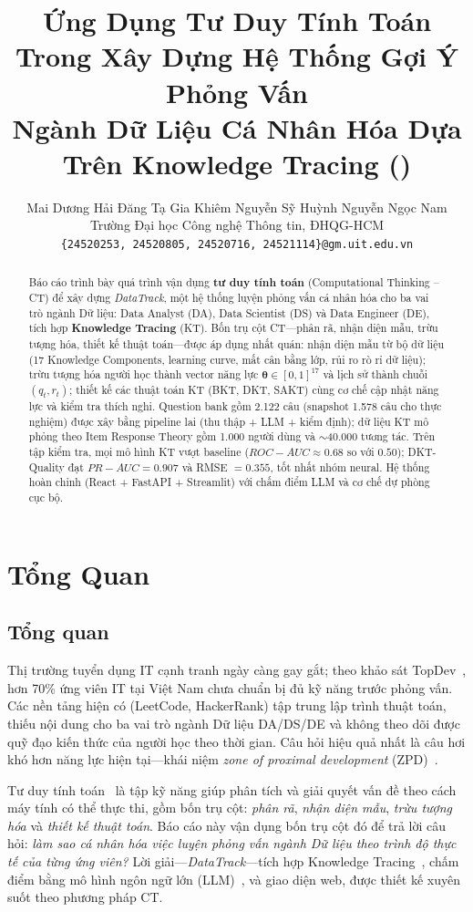 \documentclass[11pt]{article}
\title{Ứng Dụng Tư Duy Tính Toán Trong Xây Dựng Hệ Thống Gợi Ý Phỏng Vấn\\ Ngành Dữ Liệu Cá Nhân Hóa Dựa Trên Knowledge Tracing (\sys{})}
\author{
  Mai Dương Hải Đăng \quad Tạ Gia Khiêm \quad Nguyễn Sỹ Huỳnh \quad Nguyễn Ngọc Nam \\
  Trường Đại học Công nghệ Thông tin, ĐHQG-HCM \\
  \texttt{\{24520253, 24520805, 24520716, 24521114\}@gm.uit.edu.vn}
}
\newcommand{\sys}{\textit{DataTrack}}
\newcommand{\auc}{ROC-AUC}
\newcommand{\prauc}{PR-AUC}
\begin{document}
\maketitle

\begin{abstract}
Báo cáo trình bày quá trình vận dụng \textbf{tư duy tính toán} (Computational Thinking -- CT) để xây dựng \sys{}, một hệ thống luyện phỏng vấn cá nhân hóa cho ba vai trò ngành Dữ liệu: Data Analyst (DA), Data Scientist (DS) và Data Engineer (DE), tích hợp \textbf{Knowledge Tracing} (KT). Bốn trụ cột CT---phân rã, nhận diện mẫu, trừu tượng hóa, thiết kế thuật toán---được áp dụng nhất quán: nhận diện mẫu từ bộ dữ liệu (17 Knowledge Components, learning curve, mất cân bằng lớp, rủi ro rò rỉ dữ liệu); trừu tượng hóa người học thành vector năng lực $\bm{\theta}\in[0,1]^{17}$ và lịch sử thành chuỗi $(q_t,r_t)$; thiết kế các thuật toán KT (BKT, DKT, SAKT) cùng cơ chế cập nhật năng lực và kiểm tra thích nghi. Question bank gồm 2.122 câu (snapshot 1.578 câu cho thực nghiệm) được xây bằng pipeline lai (thu thập + LLM + kiểm định); dữ liệu KT mô phỏng theo Item Response Theory gồm 1.000 người dùng và $\sim$40.000 tương tác. Trên tập kiểm tra, mọi mô hình KT vượt baseline ($\auc\approx0.68$ so với $0.50$); DKT-Quality đạt $\prauc=0.907$ và RMSE $=0.355$, tốt nhất nhóm neural. Hệ thống hoàn chỉnh (React + FastAPI + Streamlit) với chấm điểm LLM và cơ chế dự phòng cục bộ.
\end{abstract}

\section{Tổng Quan}

\subsection{Tổng quan}
Thị trường tuyển dụng IT cạnh tranh ngày càng gay gắt; theo khảo sát TopDev~\cite{topdev2024}, hơn 70\% ứng viên IT tại Việt Nam chưa chuẩn bị đủ kỹ năng trước phỏng vấn. Các nền tảng hiện có (LeetCode, HackerRank) tập trung lập trình thuật toán, thiếu nội dung cho ba vai trò ngành Dữ liệu DA/DS/DE và không theo dõi được quỹ đạo kiến thức của người học theo thời gian. Câu hỏi hiệu quả nhất là câu hơi khó hơn năng lực hiện tại---khái niệm \textit{zone of proximal development} (ZPD)~\cite{vygotsky1978mind}.

Tư duy tính toán~\cite{wing2006computational} là tập kỹ năng giúp phân tích và giải quyết vấn đề theo cách máy tính có thể thực thi, gồm bốn trụ cột: \textit{phân rã}, \textit{nhận diện mẫu}, \textit{trừu tượng hóa} và \textit{thiết kế thuật toán}. Báo cáo này vận dụng bốn trụ cột đó để trả lời câu hỏi: \textit{làm sao cá nhân hóa việc luyện phỏng vấn ngành Dữ liệu theo trình độ thực tế của từng ứng viên?} Lời giải---\sys{}---tích hợp Knowledge Tracing~\cite{corbett1994knowledge}, chấm điểm bằng mô hình ngôn ngữ lớn (LLM)~\cite{team2023gemini}, và giao diện web, được thiết kế xuyên suốt theo phương pháp CT.
\end{document}
